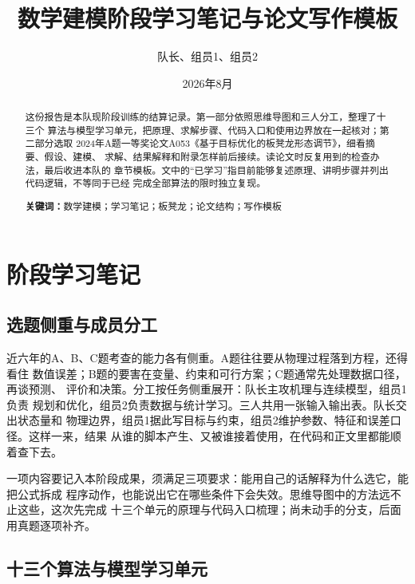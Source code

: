 \documentclass[UTF8,zihao=-4]{ctexart}
\title{\bfseries 数学建模阶段学习笔记与论文写作模板}
\author{队长、组员1、组员2}
\date{2026年8月}
\begin{document}
\maketitle

\begin{abstract}
这份报告是本队现阶段训练的结算记录。第一部分依照思维导图和三人分工，整理了十三个
算法与模型学习单元，把原理、求解步骤、代码入口和使用边界放在一起核对；第二部分选取
2024年A题一等奖论文A053《基于目标优化的板凳龙形态调节》，细看摘要、假设、建模、
求解、结果解释和附录怎样前后接续。读论文时反复用到的检查办法，最后收进本队的
章节模板。文中的“已学习”指目前能够复述原理、讲明步骤并列出代码逻辑，不等同于已经
完成全部算法的限时独立复现。

\par\noindent\textbf{关键词：}数学建模；学习笔记；板凳龙；论文结构；写作模板
\end{abstract}

\tableofcontents
\newpage

\section{阶段学习笔记}

\subsection{选题侧重与成员分工}

近六年的A、B、C题考查的能力各有侧重。A题往往要从物理过程落到方程，还得看住
数值误差；B题的要害在变量、约束和可行方案；C题通常先处理数据口径，再谈预测、
评价和决策。分工按任务侧重展开：队长主攻机理与连续模型，组员1负责
规划和优化，组员2负责数据与统计学习。三人共用一张输入输出表。队长交出状态量和
物理边界，组员1据此写目标与约束，组员2维护参数、特征和误差口径。这样一来，结果
从谁的脚本产生、又被谁接着使用，在代码和正文里都能顺着查下去。

一项内容要记入本阶段成果，须满足三项要求：能用自己的话解释为什么选它，能把公式拆成
程序动作，也能说出它在哪些条件下会失效。思维导图中的方法远不止这些，这次先完成
十三个单元的原理与代码入口梳理；尚未动手的分支，后面用真题逐项补齐。

\subsection{十三个算法与模型学习单元}
\end{document}
